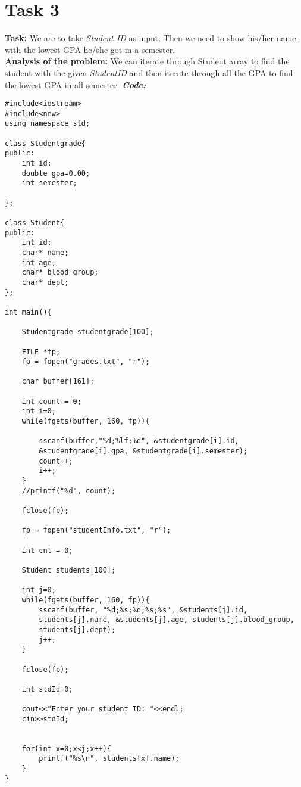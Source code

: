 \documentclass[a4paper, left=1in, right=1in,12pt]{article}
\begin{document}
\section*{Task 3}
\textbf{Task: }We are to take \textit{Student ID} as input. Then we need to show his/her name with the lowest GPA he/she got in a semester.\\
\textbf{Analysis of the problem: }We can iterate through Student array to find the student with the given \textit{StudentID} and then iterate through all the GPA to find the lowest GPA in all semester.\newline\newline
\textbf{\textit{\large Code:}}\newline
\begin{verbatim}
#include<iostream>
#include<new>
using namespace std;

class Studentgrade{
public:
    int id;
    double gpa=0.00;
    int semester;

};

class Student{
public:
    int id;
    char* name;
    int age;
    char* blood_group;
    char* dept;
};

int main(){

    Studentgrade studentgrade[100];

    FILE *fp;
    fp = fopen("grades.txt", "r");

    char buffer[161];

    int count = 0;
    int i=0;
    while(fgets(buffer, 160, fp)){

        sscanf(buffer,"%d;%lf;%d", &studentgrade[i].id,
        &studentgrade[i].gpa, &studentgrade[i].semester);
        count++;
        i++;
    }
    //printf("%d", count);

    fclose(fp);

    fp = fopen("studentInfo.txt", "r");

    int cnt = 0;

    Student students[100];

    int j=0;
    while(fgets(buffer, 160, fp)){
        sscanf(buffer, "%d;%s;%d;%s;%s", &students[j].id,
        students[j].name, &students[j].age, students[j].blood_group,
        students[j].dept);
        j++;
    }

    fclose(fp);

    int stdId=0;

    cout<<"Enter your student ID: "<<endl;
    cin>>stdId;


    for(int x=0;x<j;x++){
        printf("%s\n", students[x].name);
    }
}

\end{verbatim}
\end{document}

